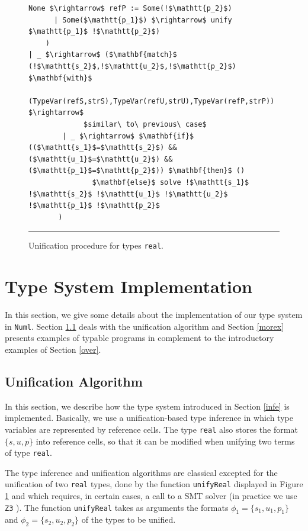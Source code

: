 \begin{figure}[tb]
{\begin{lstlisting}[mathescape]
        None $\rightarrow$ refP := Some(!$\mathtt{p_2}$) 
      | Some($\mathtt{p_1}$) $\rightarrow$ unify $\mathtt{p_1}$ !$\mathtt{p_2}$) 
    ) 
| _ $\rightarrow$ ($\mathbf{match}$ (!$\mathtt{s_2}$,!$\mathtt{u_2}$,!$\mathtt{p_2}$) $\mathbf{with}$
          (TypeVar(refS,strS),TypeVar(refU,strU),TypeVar(refP,strP)) $\rightarrow$
             $similar\ to\ previous\ case$ 
        | _ $\rightarrow$ $\mathbf{if}$ (($\mathtt{s_1}$=$\mathtt{s_2}$) && ($\mathtt{u_1}$=$\mathtt{u_2}$) && ($\mathtt{p_1}$=$\mathtt{p_2}$)) $\mathbf{then}$ () 
               $\mathbf{else}$ solve !$\mathtt{s_1}$ !$\mathtt{s_2}$ !$\mathtt{u_1}$ !$\mathtt{u_2}$ !$\mathtt{p_1}$ !$\mathtt{p_2}$
       )
\end{lstlisting}
}
\vspace{0.2cm}
\hrule
\caption{\label{unireal}Unification procedure for types \texttt{real}.}
\end{figure}

\section{Type System Implementation}
\label{implem}

In this section, we give some details about the implementation of our type system
in \texttt{Numl}. Section \ref{unif} deals with  the unification algorithm and Section
\ref{morex} presents examples of typable programs in complement to  the 
introductory examples of Section \ref{over}.

\subsection{Unification Algorithm}
\label{unif}

In this section, we describe how the type system introduced in Section \ref{infe} is implemented.
Basically, we use a unification-based type inference in which type variables are represented by
reference cells. The type \texttt{real} also stores the format $\{s,u,p\}$ into reference cells,
so that it can be modified when unifying two terms of type \texttt{real}. 

The type inference and unification algorithms are classical excepted for the unification of two
  \texttt{real} types, done by the function \texttt{unifyReal} displayed in Figure \ref{unireal}
and which requires, in certain cases, a call to a SMT solver (in practice we use \texttt{Z3} \cite{Mou08}).
The function \texttt{unifyReal} takes as arguments the formats $\phi_1=\{s_1,u_1,p_1\}$ and 
$\phi_2=\{s_2,u_2,p_2\}$ of the types to be unified.


